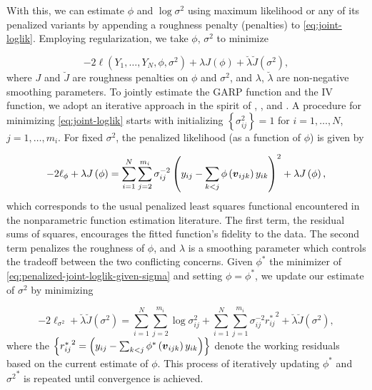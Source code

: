 \bigskip

With this, we can estimate $\phi$ and $\log\sigma^2$ using maximum likelihood or any of its penalized variants by appending a roughness penalty (penalties) to \ref{eq:joint-loglik}. Employing regularization, we take $\phi$, $\sigma^2$ to minimize 

\begin{equation} \label{eq:penalized-joint-loglik}
-2\ell\left( Y_1,\dots, Y_N, \phi, \sigma^2 \right) +    \lambda J\left( \phi \right) +  \breve{\lambda}\breve{J}\left( \sigma^2 \right),
\end{equation}
\noindent
where $J$ and $\breve{J}$ are roughness penalties on $\phi$ and $\sigma^2$, and $\lambda$, $\breve{\lambda}$ are non-negative smoothing parameters.  To jointly estimate the GARP function and the IV function, we adopt an iterative approach in the spirit of \cite{huang2006covariance}, \cite{huang2007estimation}, and \cite{pourahmadi2000maximum}. A procedure for minimizing \ref{eq:joint-loglik} starts with initializing $\left\{\sigma^2_{ij}\right\} = 1$ for $i = 1,\dots, N$, $j = 1,\dots, m_i$.  For fixed $\sigma^2$, the penalized likelihood (as a function of $\phi$) is given by

\begin{equation} \label{eq:penalized-joint-loglik-given-sigma}
-2\ell_\phi + \lambda J\left(\phi\right) = \sum_{i=1}^N \sum_{j=2}^{m_i} \sigma^{-2}_{ij}\left( y_{ij} - \sum_{k<j} \phi\left(\mbox{\boldmath $v$}_{ijk}\right) y_{ik}  \right)^2 + \lambda J\left( \phi \right),
\end{equation}
\noindent
which corresponds to the usual penalized least squares functional encountered  in the nonparametric function estimation literature. The first term, the residual sums of squares, encourages the fitted function's fidelity to the data. The second term penalizes the roughness of $\phi$, and $\lambda$ is a smoothing parameter which controls the tradeoff between the two conflicting concerns. Given $\phi^*$ the minimizer of \ref{eq:penalized-joint-loglik-given-sigma} and setting $\phi = \phi^*$, we update our estimate of $\sigma^2$ by minimizing 

\begin{equation} \label{eq:penalized-joint-loglik-given-phi}
-2\ell_{\sigma^2} + \breve{\lambda} \breve{J}\left(\sigma^2\right) = \sum_{i=1}^N \sum_{j=2}^{m_i} \log \sigma^2_{ij} + \sum_{i=1}^N \sum_{j=1}^{m_i} \sigma_{ij}^{-2} {r_{ij}^*}^2 + \breve{\lambda} \breve{J}\left(\sigma^2 \right),
\end{equation}
where the $\left\{{r_{ij}^*}^2  =\left( y_{ij} - \sum_{k<j} \phi^*\left(\mbox{\boldmath $v$}_{ijk}\right) y_{ik}  \right)\right\}$ denote the working residuals based on the current estimate of $\phi$. This process of iteratively updating $\phi^*$ and ${\sigma^2}^*$ is repeated until convergence is achieved. 
\bigskip

